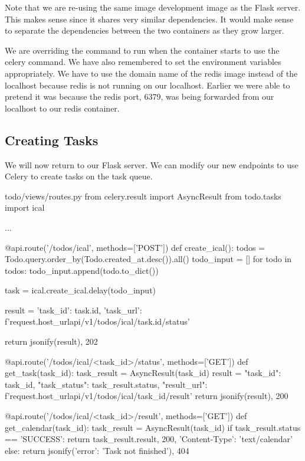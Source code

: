 \documentclass{csse4400}
\begin{document}
Note that we are re-using the same image development image as the Flask server.
This makes sense since it shares very similar dependencies.
It would make sense to separate the dependencies between the two containers as they grow larger.

We are overriding the command to run when the container starts to use the celery command.
We have also remembered to set the environment variables appropriately.
We have to use the domain name of the redis image instead of the localhost because redis is not running on our localhost.
Earlier we were able to pretend it was because the redis port, 6379, was being forwarded from our localhost to our redis container.

\subsection{Creating Tasks}

We will now return to our Flask server.
We can modify our new endpoints to use Celery to create tasks on the task queue.

\begin{code}[language=python,numbers=none]{todo/views/routes.py}
from celery.result import AsyncResult
from todo.tasks import ical

...

@api.route('/todos/ical', methods=['POST'])
def create_ical():
    todos = Todo.query.order_by(Todo.created_at.desc()).all()
    todo_input = []
    for todo in todos:
        todo_input.append(todo.to_dict())

    task = ical.create_ical.delay(todo_input)

    result = {
        'task_id': task.id,
        'task_url': f'{request.host_url}api/v1/todos/ical/{task.id}/status'
    }

    return jsonify(result), 202

@api.route('/todos/ical/<task_id>/status', methods=['GET'])
def get_task(task_id):
    task_result = AsyncResult(task_id)
    result = {
        "task_id": task_id,
        "task_status": task_result.status,
        "result_url": f'{request.host_url}api/v1/todos/ical/{task_id}/result'
    }
    return jsonify(result), 200

@api.route('/todos/ical/<task_id>/result', methods=['GET'])
def get_calendar(task_id):
    task_result = AsyncResult(task_id)
    if task_result.status == 'SUCCESS':
        return task_result.result, 200, {'Content-Type': 'text/calendar'}
    else:
        return jsonify({'error': 'Task not finished'}), 404
\end{code}
\end{document}
